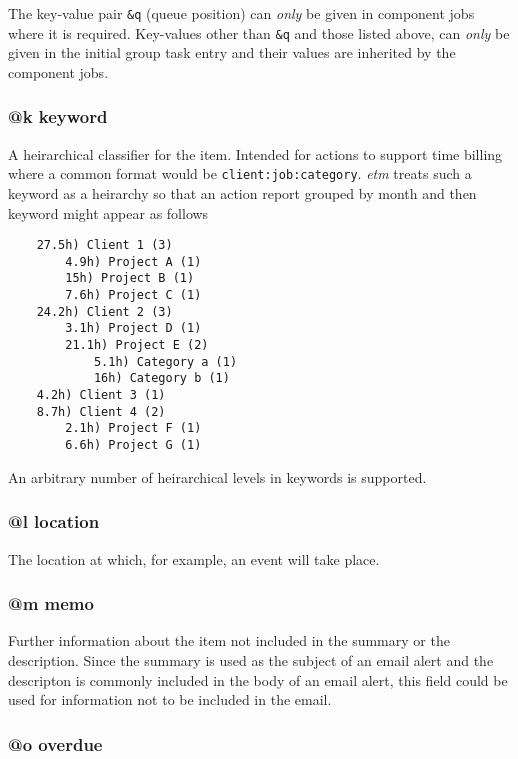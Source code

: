 \documentclass[]{article}
\begin{document}
The key-value pair \texttt{\&q} (queue position) can \emph{only} be
given in component jobs where it is required. Key-values other than
\texttt{\&q} and those listed above, can \emph{only} be given in the
initial group task entry and their values are inherited by the component
jobs.

\subsubsection{@k keyword}

A heirarchical classifier for the item. Intended for actions to support
time billing where a common format would be
\texttt{client:job:category}. \emph{etm} treats such a keyword as a
heirarchy so that an action report grouped by month and then keyword
might appear as follows

\begin{verbatim}
    27.5h) Client 1 (3)
        4.9h) Project A (1)
        15h) Project B (1)
        7.6h) Project C (1)
    24.2h) Client 2 (3)
        3.1h) Project D (1)
        21.1h) Project E (2)
            5.1h) Category a (1)
            16h) Category b (1)
    4.2h) Client 3 (1)
    8.7h) Client 4 (2)
        2.1h) Project F (1)
        6.6h) Project G (1)
\end{verbatim}

An arbitrary number of heirarchical levels in keywords is supported.

\subsubsection{@l location}

The location at which, for example, an event will take place.

\subsubsection{@m memo}

Further information about the item not included in the summary or the
description. Since the summary is used as the subject of an email alert
and the descripton is commonly included in the body of an email alert,
this field could be used for information not to be included in the
email.

\subsubsection{@o overdue}
\end{document}
